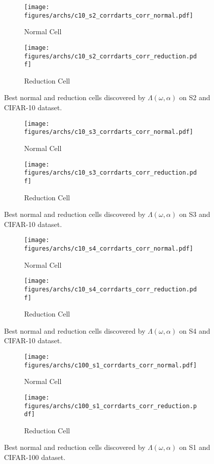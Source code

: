 \documentclass{article} \usepackage{fancyhdr, iclr2023_conference, times}
\begin{document}
\begin{figure}[h]
    \centering
    \begin{subfigure}[h]{0.5\textwidth}
        \centering
        \texttt{[image: figures/archs/c10\_s2\_corrdarts\_corr\_normal.pdf]}
        \caption{Normal Cell}
    \end{subfigure}\begin{subfigure}[h]{0.5\textwidth}
        \centering
        \texttt{[image: figures/archs/c10\_s2\_corrdarts\_corr\_reduction.pdf]}
        \caption{Reduction Cell}
    \end{subfigure}
    \caption{Best normal and reduction cells discovered by $\Lambda(\omega, \alpha)$ on S2 and CIFAR-10 dataset.}
\end{figure}
\begin{figure}[h]
    \centering
    \begin{subfigure}[h]{0.5\textwidth}
        \centering
        \texttt{[image: figures/archs/c10\_s3\_corrdarts\_corr\_normal.pdf]}
        \caption{Normal Cell}
    \end{subfigure}\begin{subfigure}[h]{0.5\textwidth}
        \centering
        \texttt{[image: figures/archs/c10\_s3\_corrdarts\_corr\_reduction.pdf]}
        \caption{Reduction Cell}
    \end{subfigure}
    \caption{Best normal and reduction cells discovered by $\Lambda(\omega, \alpha)$ on S3 and CIFAR-10 dataset.}
\end{figure}
\begin{figure}[h]
    \centering
    \begin{subfigure}[h]{0.5\textwidth}
        \centering
        \texttt{[image: figures/archs/c10\_s4\_corrdarts\_corr\_normal.pdf]}
        \caption{Normal Cell}
    \end{subfigure}\begin{subfigure}[h]{0.5\textwidth}
        \centering
        \texttt{[image: figures/archs/c10\_s4\_corrdarts\_corr\_reduction.pdf]}
        \caption{Reduction Cell}
    \end{subfigure}
    \caption{Best normal and reduction cells discovered by $\Lambda(\omega, \alpha)$ on S4 and CIFAR-10 dataset.}
\end{figure}
\begin{figure}[h]
    \centering
    \begin{subfigure}[h]{0.5\textwidth}
        \centering
        \texttt{[image: figures/archs/c100\_s1\_corrdarts\_corr\_normal.pdf]}
        \caption{Normal Cell}
    \end{subfigure}\begin{subfigure}[h]{0.5\textwidth}
        \centering
        \texttt{[image: figures/archs/c100\_s1\_corrdarts\_corr\_reduction.pdf]}
        \caption{Reduction Cell}
    \end{subfigure}
    \caption{Best normal and reduction cells discovered by $\Lambda(\omega, \alpha)$ on S1 and CIFAR-100 dataset.}
\end{figure}
\end{document}
